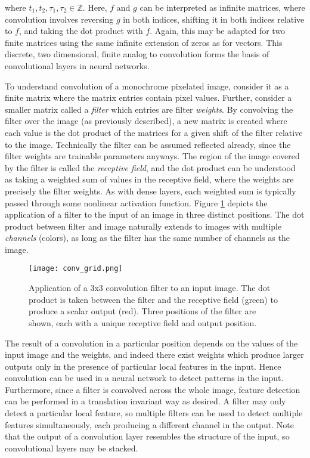 \noindent
where $t_1, t_2, \tau_1, \tau_2 \in \mathbb{Z}$.
Here, $f$ and $g$ can be interpreted as infinite matrices, where convolution involves reversing $g$ in both indices, shifting it in both indices relative to $f$, and taking the dot product with $f$.
Again, this may be adapted for two finite matrices using the same infinite extension of zeros as for vectors.
This discrete, two dimensional, finite analog to convolution forms the basis of convolutional layers in neural networks.

To understand convolution of a monochrome pixelated image, consider it as a finite matrix where the matrix entries contain pixel values.
Further, consider a smaller matrix called a \emph{filter} which entries are filter \emph{weights}.
By convolving the filter over the image (as previously described), a new matrix is created where each value is the dot product of the matrices for a given shift of the filter relative to the image.
Technically the filter can be assumed reflected already, since the filter weights are trainable parameters anyways.
The region of the image covered by the filter is called the \emph{receptive field}, and the dot product can be understood as taking a weighted sum of values in the receptive field, where the weights are precisely the filter weights.
As with dense layers, each weighted sum is typically passed through some nonlinear activation function.
Figure \ref{fig:convolutionallayer} depicts the application of a filter to the input of an image in three distinct positions.
The dot product between filter and image naturally extends to images with multiple \emph{channels} (colors), as long as the filter has the same number of channels as the image.

\begin{figure}
	\centering
	\texttt{[image: conv\_grid.png]}
	\caption{Application of a 3x3 convolution filter to an input image. The dot product is taken between the filter and the receptive field (green) to produce a scalar output (red). Three positions of the filter are shown, each with a unique receptive field and output position.}
	\label{fig:convolutionallayer}
\end{figure}

The result of a convolution in a particular position depends on the values of the input image and the weights, and indeed there exist weights which produce larger outputs only in the presence of particular local features in the input.
Hence convolution can be used in a neural network to detect patterns in the input.
Furthermore, since a filter is convolved across the whole image, feature detection can be performed in a translation invariant way as desired. 
A filter may only detect a particular local feature, so multiple filters can be used to detect multiple features simultaneously, each producing a different channel in the output.
Note that the output of a convolution layer resembles the structure of the input, so convolutional layers may be stacked.

